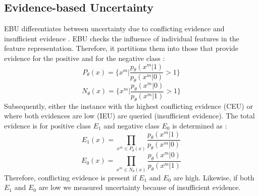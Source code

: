\subsection{Evidence-based Uncertainty} 
\label{subsec:evidence_based_uncertainty}

\ac{EBU} differentiates between uncertainty due to conflicting evidence and insufficient evidence \cite{nguyen2021howtomeasure}.
\ac{EBU} checks the influence of individual features in the feature representation.
Therefore, it partitions them into those that provide evidence for the positive and for the negative class \cite{nguyen2021howtomeasure}:
\begin{equation}
    P_{\theta}(x) = \bigg\{ x^m \bigg| \frac{p_{\theta}(x^m|1)}{p_{\theta}(x^m|0)} > 1 \bigg\} 
\end{equation}
 \begin{equation}
    N_{\theta}(x) = \bigg\{ x^m \bigg| \frac{p_{\theta}(x^m|0)}{p_{\theta}(x^m|1)} > 1 \bigg\} 
\end{equation}
Subsequently, either the instance with the highest conflicting evidence (\ac{CEU}) or where both evidences are low (\ac{IEU}) are queried (insufficient evidence).
The total evidence is for positive class $E_1$ and negative class $E_0$ is determined as \cite{nguyen2021howtomeasure}:
\begin{equation}
    E_1(x) = \prod\limits_{x^m \in P_{\theta}(x)} \frac{p_{\theta}(x^m|1)}{p_{\theta}(x^m|0)}
\end{equation}
\begin{equation}
    E_0(x) = \prod\limits_{x^m \in N_{\theta}(x)} \frac{p_{\theta}(x^m|0)}{p_{\theta}(x^m|1)}
\end{equation} 
Therefore, conflicting evidence is present if $E_1$ and $E_0$ are high.
Likewise, if both $E_1$ and $E_0$ are low we measured uncertainty because of insufficient evidence.
